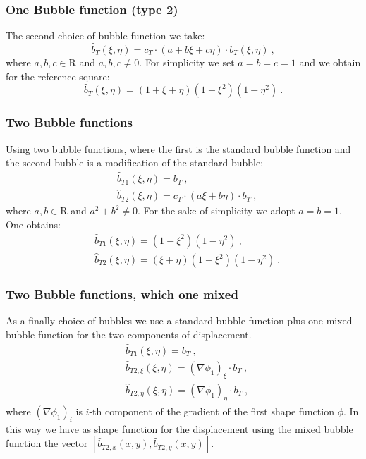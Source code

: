 \documentclass[preprint,12pt,authoryear]{elsarticle}
\begin{document}
\subsubsection{One Bubble function (type 2)}
The second choice of bubble function we take:
\begin{equation}\label{eq:bubble_2}
\hat{b}_{T}(\xi,\eta) = c_{T}\cdot (a+b\xi+c\eta)\cdot b_{T}(\xi,\eta)\:,
\end{equation}
where $a,b,c \in \mathrm{R}$ and $a,b,c \neq 0$.
For simplicity we set $a=b=c=1$ and we obtain for the reference square:
\begin{equation}\label{eq:bubble_2_ref}
\hat{b}_{T}(\xi,\eta) = (1+\xi+\eta)(1-\xi^{2})(1-\eta^{2})\:.
\end{equation} 

\subsubsection{Two Bubble functions}
Using two bubble functions, where the first is the standard bubble function and the second bubble is a modification of the standard bubble:
\begin{equation}\label{eq:bubble_3}
\begin{split}
&\hat{b}_{T1}(\xi,\eta) = b_{T}\:, \\
&\hat{b}_{T2}(\xi,\eta) = c_{T}\cdot (a\xi+b\eta)\cdot b_{T}\:,
\end{split}
\end{equation}
where $a,b \in \mathrm{R}$ and $a^{2}+b^{2}\neq 0$.
For the sake of simplicity we adopt $a=b=1$.
One obtains:
\begin{equation}\label{eq:bubble_3_ref}
\begin{split}
&\hat{b}_{T1}(\xi,\eta) = (1-\xi^{2})(1-\eta^{2})\:, \\
&\hat{b}_{T2}(\xi,\eta) = (\xi+\eta)(1-\xi^{2})(1-\eta^{2})\:.
\end{split}
\end{equation}

\subsubsection{Two Bubble functions, which one mixed}
As a finally choice of bubbles we use a standard bubble function plus one mixed bubble function for the two components of displacement.
\begin{equation}
\begin{split}
&\hat{b}_{T1}(\xi,\eta) = b_{T}\:, \\
&\hat{b}_{T2,\xi}(\xi,\eta) = (\nabla \phi_{1})_{\xi}\cdot b_{T}\:, \\
&\hat{b}_{T2,\eta}(\xi,\eta) = (\nabla \phi_{1})_{\eta}\cdot b_{T}\:,
\end{split}
\end{equation}
where $(\nabla\phi_{1})_{i}$ is $i$-th component of the gradient of the first shape function $\phi$.
In this way we have as shape function for the displacement using the mixed bubble function the vector $\left[\hat{b}_{T2,x}(x,y),\hat{b}_{T2,y}(x,y)\right]$. 
\end{document}
